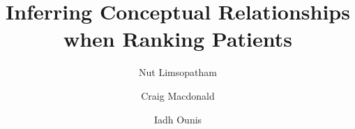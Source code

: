 \documentclass[1p]{elsarticle}
\begin{document}
\title{Inferring Conceptual Relationships when Ranking Patients}


\author[cam]{Nut Limsopatham} %

\author[gla]{Craig Macdonald}

\author[gla]{Iadh Ounis}

\address[cam]{Language Technology Lab, University of Cambridge, United Kingdom}
\address[gla] {School of Computing Science, University of Glasgow, United Kingdom}


%
\end{document}

